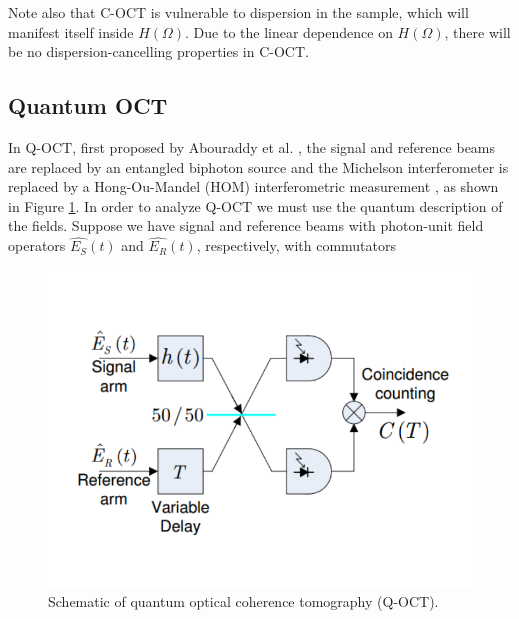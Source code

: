 Note also that C-OCT is vulnerable to dispersion in the sample, which will manifest itself inside $H(\Omega)$. Due to the linear dependence on $H(\Omega)$, there will be no dispersion-cancelling properties in C-OCT.

\subsection{Quantum OCT}

In Q-OCT, first proposed by Abouraddy et al. \cite{abouraddy-qoct}, the signal and reference beams are replaced by an entangled biphoton source and the Michelson interferometer is replaced by a Hong-Ou-Mandel (HOM) interferometric measurement \cite{hong-measurement}, as shown in Figure \ref{figure:pcoct-schematic-qoct}. In order to analyze Q-OCT we must use the quantum description of the fields. Suppose we have signal and reference beams with photon-unit field operators $\hat{E_S}(t)$ and $\hat{E_R}(t)$, respectively, with commutators

\begin{figure}[t]
\begin{center}
\includegraphics[width=13cm]{figure-pcoct-schematic-qoct.pdf}
\caption{Schematic of quantum optical coherence tomography (Q-OCT).}
\label{figure:pcoct-schematic-qoct}
\end{center}
\end{figure}

